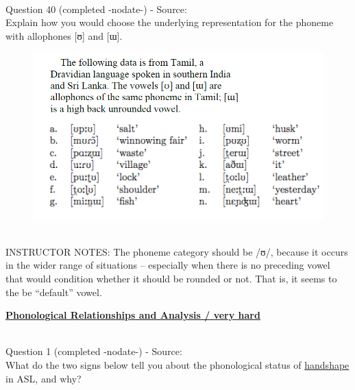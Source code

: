 \documentclass[12pt]{article}
\begin{document}
~\\

{\large Question 40} (completed -nodate-) - Source: \\

Explain how you would choose the underlying representation for the phoneme with allophones [ʊ] and [ɯ].\\

\begin{figure}[H]
\includegraphics{../images/tamil.png}
\end{figure}

~\\
INSTRUCTOR NOTES: The phoneme category should be /ʊ/, because it occurs in the wider range of situations – especially when there is no preceding vowel that would condition whether it should be rounded or not. That is, it seems to the be “default” vowel.


\newpage\textbf{\underline{\huge Phonological Relationships and Analysis / very hard\\}}

~\\

{\large Question 1} (completed -nodate-) - Source: \\

What do the two signs below tell you about the phonological status of \underline{handshape} in ASL, and why?\\
\end{document}
